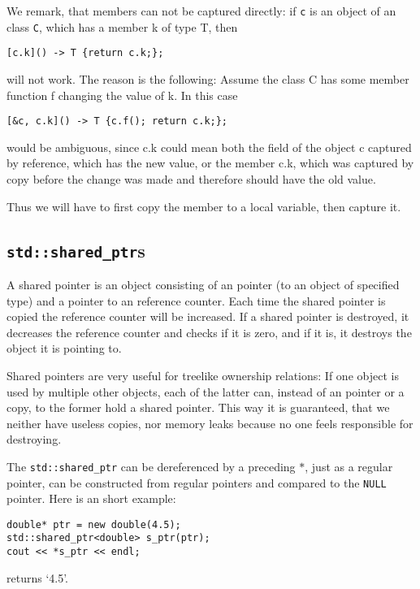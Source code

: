 \documentclass{article}
\newcommand{\code}[1]{\texttt{#1}}
\newcommand{\NULL}{\texttt{NULL} pointer\xspace}
\begin{document}
We remark, that members can not be captured directly: if \code c is an object of an class \code C, which has a member k of type T, then
\begin{lstlisting}
[c.k]() -> T {return c.k;};
\end{lstlisting}
will not work. The reason is the following: Assume the class C has some member function f changing the value of k. In this case
\begin{lstlisting}
[&c, c.k]() -> T {c.f(); return c.k;};
\end{lstlisting}
would be ambiguous, since c.k could mean both the field of the object c captured by reference, which has the new value, or the member c.k, which was captured by copy before the change was made and therefore should have the old value.

Thus we will have to first copy the member to a local variable, then capture it.

\subsection{\code{std::shared\_ptr}s}

A shared pointer is an object consisting of an pointer (to an object of specified type) and a pointer to an reference counter. Each time the shared pointer is copied the reference counter will be increased. If a shared pointer is destroyed, it decreases the reference counter and checks if it is zero, and if it is, it destroys the object it is pointing to.

Shared pointers are very useful for treelike ownership relations: If one object is used by multiple other objects, each of the latter can, instead of an pointer or a copy, to the former hold a shared pointer. This way it is guaranteed, that we neither have useless copies, nor memory leaks because no one feels responsible for destroying.

The \code{std::shared\_ptr} can be dereferenced by a preceding $*$, just as a regular pointer, can be constructed from regular pointers and compared to the \NULL. Here is an short example:

\begin{lstlisting}
double* ptr = new double(4.5);
std::shared_ptr<double> s_ptr(ptr);
cout << *s_ptr << endl;
\end{lstlisting}
returns \lq 4.5\rq.
\end{document}
